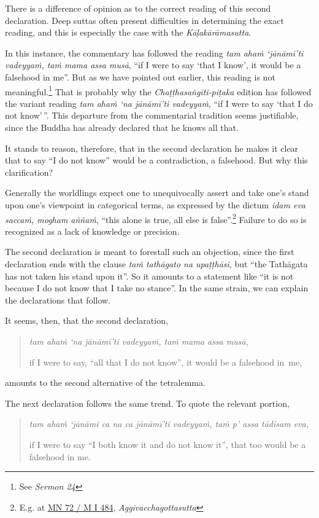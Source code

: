 There is a difference of opinion as to the correct reading of this second declaration. Deep suttas often present difficulties in determining the exact reading, and this is especially the case with the \emph{Kāḷakārāmasutta}.

In this instance, the commentary has followed the reading \emph{tam ahaṁ `jānāmī'ti vadeyyaṁ, taṁ mama assa musā}, ``if I were to say `that I know', it would be a falsehood in me''. But as we have pointed out earlier, this reading is not meaningful.\footnote{See \emph{Sermon 24}} That is probably why the \emph{Chaṭṭhasaṅgīti-piṭaka} edition has followed the variant reading \emph{tam ahaṁ `na jānāmī'ti vadeyyaṁ}, ``if I were to say `that I do not know'\,''. This departure from the commentarial tradition seems justifiable, since the Buddha has already declared that he knows all that.

It stands to reason, therefore, that in the second declaration he makes it clear that to say ``I do not know'' would be a contradiction, a falsehood. But why this clarification?

Generally the worldlings expect one to unequivocally assert and take one's stand upon one's viewpoint in categorical terms, as expressed by the dictum \emph{idam eva saccaṁ, mogham aññaṁ}, ``this alone is true, all else is false''.\footnote{E.g. at \href{https://suttacentral.net/mn72/pli/ms}{MN 72 / M I 484}, \emph{Aggivacchagottasutta}} Failure to do so is recognized as a lack of knowledge or precision.

The second declaration is meant to forestall such an objection, since the first declaration ends with the clause \emph{taṁ tathāgato na upaṭṭhāsi}, but ``the Tathāgata has not taken his stand upon it''. So it amounts to a statement like ``it is not because I do not know that I take no stance''. In the same strain, we can explain the declarations that follow.

It seems, then, that the second declaration,

\begin{quote}
\emph{tam ahaṁ `na jānāmī'ti vadeyyaṁ, taṁ mama assa musā},

if I were to say, ``all that I do not know'', it would be a falsehood in~me,
\end{quote}

amounts to the second alternative of the tetralemma.

The next declaration follows the same trend. To quote the relevant portion,

\begin{quote}
\emph{tam ahaṁ `jānāmi ca na ca jānāmī'ti vadeyyaṁ, taṁ p' assa tādisam eva,}

if I were to say ``I both know it and do not know it'', that too would be a falsehood in me.
\end{quote}

